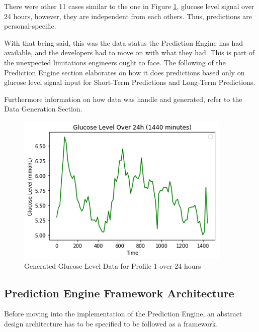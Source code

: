 There were other 11 cases similar to the one in Figure \ref{data-status}, glucose level signal over 24 hours, however, they are independent from each others. Thus, predictions are personal-specific.

With that being said, this was the data status the Prediction Engine has had available, and the developers had to move on with what they had. This is part of the unexpected limitations engineers ought to face. The following of the Prediction Engine section elaborates on how it does predictions based only on glucose level signal input for Short-Term Predictions and Long-Term Predictions. 

Furthermore information on how data was handle and generated, refer to the Data Generation Section.  

\begin{center}
\begin{figure}[ht!]
	\centering
    \includegraphics[width=\textwidth]{Figures/mo/data-status.png}
 	\caption{Generated Glucose Level Data for Profile 1 over 24 hours}
  	\label{data-status}
\end{figure}
\end{center}


\subsection{Prediction Engine Framework Architecture}
Before moving into the implementation of the Prediction Engine, an abstract design architecture has to be specified to be followed as a framework. 

